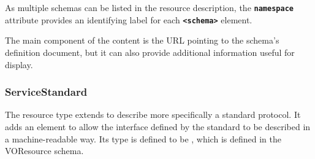 \documentclass[11pt,a4paper]{ivoa}
\begin{document}

As multiple schemas can be listed in the resource description, the
\textbf{\texttt{namespace}} attribute provides an
identifying label for each \textbf{\texttt{<schema>}} 
element.


The main component of the 
content is the URL pointing to the schema's definition document, but
it can also provide additional information useful for display.


\subsubsection{ServiceStandard}

The  resource type extends
 to describe more
specifically a standard protocol.  It adds an 
 element to allow the interface defined
by the standard to be described in a machine-readable way.  Its type
is defined to be , which is defined in the
VOResource schema.
\end{document}
